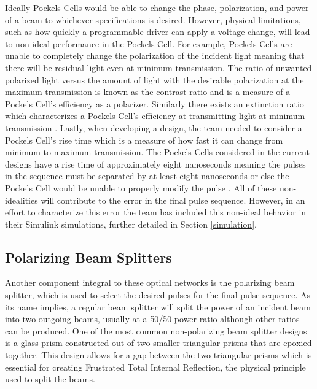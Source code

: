\documentclass[pdftex,12pt,a4paper]{article}
\begin{document}
Ideally Pockels Cells would be able to change the phase, polarization, and power of a beam to whichever specifications is desired.  However, physical limitations, such as how quickly a programmable driver can apply a voltage change, will lead to non-ideal performance in the Pockels Cell. For example, Pockels Cells are unable to completely change the polarization of the incident light meaning that there will be residual light even at minimum transmission. The ratio of unwanted polarized light versus the amount of light with the desirable polarization at the maximum transmission is known as the contrast ratio and is a measure of a Pockels Cell’s efficiency as a polarizer. Similarly there exists an extinction ratio which characterizes a Pockels Cell’s efficiency at transmitting light at minimum transmission \cite{Sintec}. Lastly, when developing a design, the team needed to consider a Pockels Cell’s rise time which is a measure of how fast it can change from minimum to maximum transmission. The Pockels Cells considered in the current designs have a rise time of approximately eight nanoseconds meaning the pulses in the sequence must be separated by at least eight nanoseconds or else the Pockels Cell would be unable to properly modify the pulse \cite{Sintec}. All of these non-idealities will contribute to the error in the final pulse sequence. However, in an effort to characterize this error the team has included this non-ideal behavior in their Simulink simulations, further detailed in Section \ref{simulation}. 

\subsection{Polarizing Beam Splitters}

Another component integral to these optical networks is the polarizing beam splitter, which is used to select the desired pulses for the final pulse sequence. As its name implies, a regular beam splitter will split the power of an incident beam into two outgoing beams, usually at a 50/50 power ratio although other ratios can be produced. One of the most common non-polarizing beam splitter designs is a glass prism constructed out of two smaller triangular prisms that are epoxied together\cite{Properties_of_Prisms}. This design allows for a gap between the two triangular prisms which is essential for creating Frustrated Total Internal Reflection, the physical principle used to split the beams.
\end{document}
